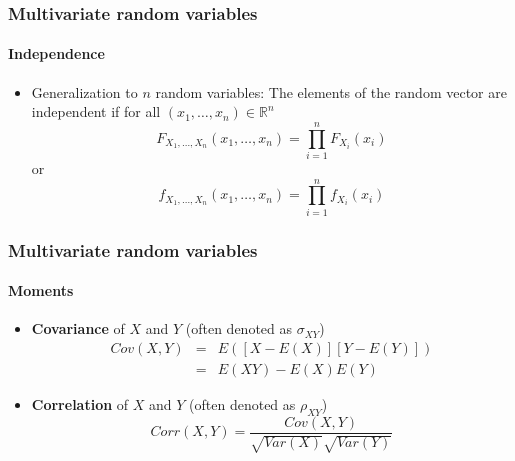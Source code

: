 \documentclass[notes=show]{beamer}
\begin{document}
\begin{frame}\frametitle{Multivariate random variables}\framesubtitle{Independence}
\begin{itemize}
    \item Generalization to $n$ random variables: The elements of the random vector are independent if for all $\left( x_{1},\ldots ,x_{n}\right) \in \mathbb{R}^{n}$
    \begin{equation*}
        F_{X_{1},\ldots ,X_{n}}\left( x_{1},\ldots ,x_{n}\right) =\prod_{i=1}^{n}F_{X_{i}}(x_{i})
    \end{equation*}
    or
    \begin{equation*}
        f_{X_{1},\ldots ,X_{n}}\left( x_{1},\ldots ,x_{n}\right)            =\prod_{i=1}^{n}f_{X_{i}}(x_{i})
    \end{equation*}
\end{itemize}
\end{frame}


\begin{frame}\frametitle{Multivariate random variables}\framesubtitle{Moments}
\begin{itemize}
    \item \textbf{Covariance} of $X$ and $Y$ (often denoted as $\sigma _{XY}$)%
    \begin{eqnarray*}
        Cov\left( X,Y\right) &=&E\left( \left[ X-E\left( X\right) \right] \left[Y-E\left( Y\right) \right] \right) \\
        &=&E(XY)-E(X)E(Y)
    \end{eqnarray*}
    \item \textbf{Correlation} of $X$ and $Y$ (often denoted as $\rho _{XY}$)%
    \begin{equation*}
        Corr\left( X,Y\right) =\frac{Cov\left( X,Y\right) }{\sqrt{Var\left( X\right)}\sqrt{Var\left( Y\right) }}
    \end{equation*}
\end{itemize}
\end{frame}
\end{document}
